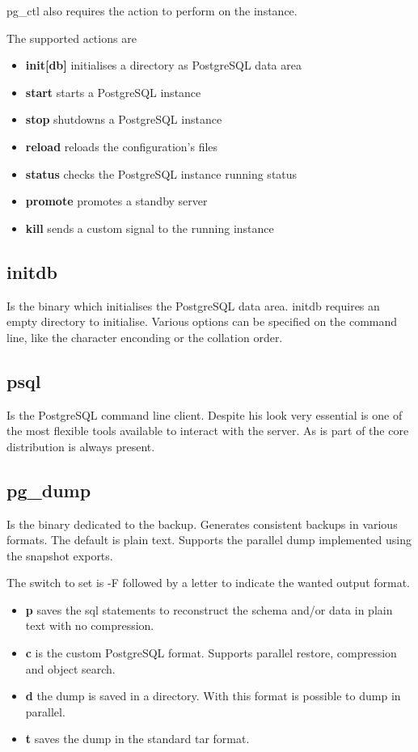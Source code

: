 pg\_ctl also requires the action to perform on the instance.

The supported actions are

\begin{itemize}
 \item \textbf{init[db]} initialises a directory as PostgreSQL data area
 \item \textbf{start} starts a PostgreSQL instance
 \item \textbf{stop} shutdowns a PostgreSQL instance
 \item \textbf{reload} reloads the configuration's files
 \item \textbf{status} checks the PostgreSQL instance running status
 \item \textbf{promote} promotes a standby server 
 \item \textbf{kill} sends a custom signal to the running instance
\end{itemize}


\subsection{initdb}
Is the binary which initialises the PostgreSQL data area. 
initdb requires an empty directory to initialise. 
Various options can be specified on the command line, like the character enconding or the collation order. 


\subsection{psql}
Is the PostgreSQL command line client. 
Despite his look very essential is one of the most flexible tools available to interact with the server.
As is part of the core distribution is always present.

\subsection{pg\_dump}
\label{sub:PGDUMP}
Is the binary dedicated to the backup. Generates consistent backups in various formats. The default is plain text. 
Supports the parallel dump implemented using the snapshot exports. 

The switch to set is -F followed by a letter to indicate the wanted output format.

\begin{itemize}
 \item \textbf{p} saves the sql statements to reconstruct the schema and/or data in plain text with no compression.
 \item \textbf{c} is the custom PostgreSQL format. Supports parallel restore, compression and object search.
 \item \textbf{d} the dump is saved in a directory. With this format is possible to dump in parallel.
 \item \textbf{t} saves the dump in the standard tar format.
 \end{itemize}

